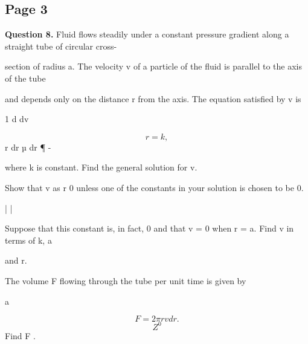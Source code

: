\documentclass[12pt]{article}
\begin{document}
\subsection*{Page 3}
\begin{flushleft}
\bigskip\textbf{Question 8.} Fluid flows steadily under a constant pressure gradient along a straight tube of circular cross-\par
section of radius a. The velocity v of a particle of the fluid is parallel to the axis of the tube\par
and depends only on the distance r from the axis. The equation satisfied by v is\par
1 d dv\par
\[r = k,\]
r dr µ dr ¶ -\par
where k is constant. Find the general solution for v.\par
Show that v as r 0 unless one of the constants in your solution is chosen to be 0.\par
| | \to \infty \to\par
Suppose that this constant is, in fact, 0 and that v = 0 when r = a. Find v in terms of k, a\par
and r.\par
The volume F flowing through the tube per unit time is given by\par
a\par
\[F = 2\pi rv dr.\]
\[Z^0\]
Find F .\par
\end{flushleft}
\end{document}
